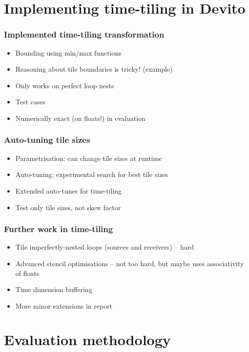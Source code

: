 \documentclass{beamer}
\begin{document}
\section{Implementing time-tiling in Devito}

\begin{frame}
\frametitle{Implemented time-tiling transformation}

\begin{itemize}
	\item Bounding using min/max functions
	\item Reasoning about tile boundaries is tricky! (example)
	\item Only works on perfect loop nests \Sadey
	\item Test cases
	\item Numerically exact (on floats!) in evaluation
\end{itemize}
\end{frame}



\begin{frame}
\frametitle{Auto-tuning tile sizes}

\begin{itemize}
	\item Parametrisation: can change tile sizes at runtime
	\item Auto-tuning: experimental search for best tile sizes
	\item Extended auto-tuner for time-tiling
	\item Test only tile sizes, not skew factor
\end{itemize}
\end{frame}



\begin{frame}
\frametitle{Further work in time-tiling}

\begin{itemize}
	\item Tile imperfectly-nested loops (sources and receivers) -- hard
	\item Advanced stencil optimisations -- not too hard, but maybe uses associativity of floats \Sadey
	\item Time dimension buffering
	\item More minor extensions in report
\end{itemize}
\end{frame}



\section{Evaluation methodology}
\end{document}
